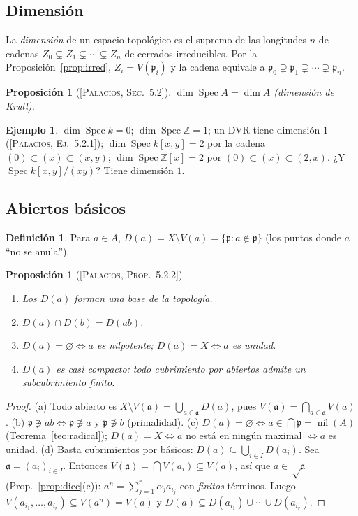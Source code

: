 \documentclass[11pt,a4paper]{article}
\newcommand{\Spec}{\operatorname{Spec}}
\newcommand{\nil}{\operatorname{nil}}
\newcommand{\ZZ}{\mathbb{Z}}
\newcommand{\pp}{\mathfrak{p}}
\newcommand{\aaa}{\mathfrak{a}}
\theoremstyle{plain}
\newtheorem{proposicion}[teorema]{Proposición}
\theoremstyle{definition}
\newtheorem{definicion}[teorema]{Definición}
\newtheorem{ejemplo}[teorema]{Ejemplo}
\theoremstyle{remark}
\newcounter{ej}
\newcommand{\libro}[1]{\textsc{[Palacios, #1]}}
\begin{document}
\subsection{Dimensión}

La \emph{dimensión} de un espacio topológico es el supremo de las longitudes $n$ de cadenas $Z_0\subsetneq Z_1\subsetneq\cdots\subsetneq Z_n$ de cerrados irreducibles. Por la Proposición~\ref{prop:irred}, $Z_i=V(\pp_i)$ y la cadena equivale a $\pp_0\supsetneq\pp_1\supsetneq\cdots\supsetneq\pp_n$.

\begin{proposicion}[{\libro{Sec.~5.2}}]
$\dim\Spec A=\dim A$ (dimensión de Krull).
\end{proposicion}

\begin{ejemplo}
$\dim\Spec k=0$; $\dim\Spec\ZZ=1$; un DVR tiene dimensión $1$ (\libro{Ej.~5.2.1}); $\dim\Spec k[x,y]=2$ por la cadena $(0)\subset(x)\subset(x,y)$; $\dim\Spec\ZZ[x]=2$ por $(0)\subset(x)\subset(2,x)$. ¿Y $\Spec k[x,y]/(xy)$? Tiene dimensión $1$.
\end{ejemplo}

\subsection{Abiertos básicos}

\begin{definicion}
Para $a\in A$, $D(a)=X\setminus V(a)=\{\pp:a\notin\pp\}$ (los puntos donde $a$ ``no se anula'').
\end{definicion}

\begin{proposicion}[{\libro{Prop.~5.2.2}}]\label{prop:Da}
\begin{enumerate}[label=(\alph*),itemsep=1pt]
\item Los $D(a)$ forman una base de la topología.
\item $D(a)\cap D(b)=D(ab)$.
\item $D(a)=\varnothing\iff a$ es nilpotente; $D(a)=X\iff a$ es unidad.
\item $D(a)$ es \emph{casi compacto}: todo cubrimiento por abiertos admite un subcubrimiento finito.
\end{enumerate}
\end{proposicion}
\begin{proof}
(a) Todo abierto es $X\setminus V(\aaa)=\bigcup_{a\in\aaa}D(a)$, pues $V(\aaa)=\bigcap_{a\in\aaa}V(a)$.
(b) $\pp\not\ni ab\iff\pp\not\ni a$ y $\pp\not\ni b$ (primalidad).
(c) $D(a)=\varnothing\iff a\in\bigcap\pp=\nil(A)$ (Teorema~\ref{teo:radical}); $D(a)=X\iff a$ no está en ningún maximal $\iff a$ es unidad.
(d) Basta cubrimientos por básicos: $D(a)\subseteq\bigcup_{i\in I}D(a_i)$. Sea $\aaa=(a_i)_{i\in I}$. Entonces $V(\aaa)=\bigcap V(a_i)\subseteq V(a)$, así que $a\in\sqrt\aaa$ (Prop.~\ref{prop:dicc}(c)): $a^n=\sum_{j=1}^r\alpha_ja_{i_j}$ con \emph{finitos} términos. Luego $V(a_{i_1},\dots,a_{i_r})\subseteq V(a^n)=V(a)$ y $D(a)\subseteq D(a_{i_1})\cup\cdots\cup D(a_{i_r})$.
\end{proof}
\end{document}
